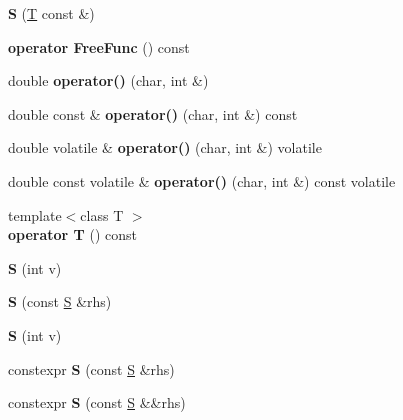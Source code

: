 \begin{DoxyCompactItemize}
{\bfseries S} (\mbox{\hyperlink{struct_t}{T}} const \&)
\item 
\mbox{\label{struct_s_a73f38207b5ba3a9fd2c215112fd8de48}} 
{\bfseries operator Free\+Func} () const
\item 
\mbox{\label{struct_s_aebdf3c54e0829c2ce5e9858798a77f29}} 
double {\bfseries operator()} (char, int \&)
\item 
\mbox{\label{struct_s_ab4b231defbc8fbf923a522fd03cfb695}} 
double const  \& {\bfseries operator()} (char, int \&) const
\item 
\mbox{\label{struct_s_af2a857016dce204b4423e9949c74ed8f}} 
double volatile \& {\bfseries operator()} (char, int \&) volatile
\item 
\mbox{\label{struct_s_a8c0108db097d0260a2ece67e0215d56f}} 
double const volatile \& {\bfseries operator()} (char, int \&) const volatile
\item 
\mbox{\label{struct_s_a30ab17757ee813091ff25ecd454f7762}} 
{\footnotesize template$<$class T $>$ }\\{\bfseries operator T} () const
\item 
\mbox{\label{struct_s_ab33bc4a94d3a6beb1bd162375df63b2a}} 
{\bfseries S} (int v)
\item 
\mbox{\label{struct_s_a994f7bb3c1c2b625fd60acb3daad7f58}} 
{\bfseries S} (const \mbox{\hyperlink{struct_s}{S}} \&rhs)
\item 
\mbox{\label{struct_s_ab33bc4a94d3a6beb1bd162375df63b2a}} 
{\bfseries S} (int v)
\item 
\mbox{\label{struct_s_a7e55e3de0d1166e7f119d5295dbec4da}} 
constexpr {\bfseries S} (const \mbox{\hyperlink{struct_s}{S}} \&rhs)
\item 
\mbox{\label{struct_s_a1ac8a18a2cd0412ff322c4d50f455f58}} 
constexpr {\bfseries S} (const \mbox{\hyperlink{struct_s}{S}} \&\&rhs)
\item 
\mbox{\label{struct_s_a63d21244cb995a47eaf521a614855c7a}} 

\end{DoxyCompactItemize}
